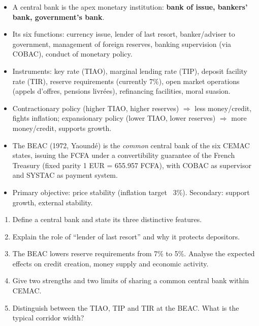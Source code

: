 \documentclass[11pt]{article}
\begin{document}
\begin{aretenir}
\begin{itemize}
\item A central bank is the apex monetary institution: \textbf{bank of issue, bankers' bank, government's bank}.
\item Its six functions: currency issue, lender of last resort, banker/adviser to government, management of foreign reserves, banking supervision (via COBAC), conduct of monetary policy.
\item Instruments: key rate (TIAO), marginal lending rate (TIP), deposit facility rate (TIR), reserve requirements (currently 7\%), open market operations (appels d'offres, pensions livrées), refinancing facilities, moral suasion.
\item Contractionary policy (higher TIAO, higher reserves) $\Rightarrow$ less money/credit, fights inflation; expansionary policy (lower TIAO, lower reserves) $\Rightarrow$ more money/credit, supports growth.
\item The BEAC (1972, Yaoundé) is the \emph{common} central bank of the six CEMAC states, issuing the FCFA under a convertibility guarantee of the French Treasury (fixed parity 1 EUR = 655.957 FCFA), with COBAC as supervisor and SYSTAC as payment system.
\item Primary objective: price stability (inflation target ~3\%). Secondary: support growth, external stability.
\end{itemize}
\end{aretenir}

\begin{exercice}
\begin{enumerate}
\item Define a central bank and state its three distinctive features.
\item Explain the role of ``lender of last resort'' and why it protects depositors.
\item The BEAC lowers reserve requirements from 7\% to 5\%. Analyse the expected effects on credit creation, money supply and economic activity.
\item Give two strengths and two limits of sharing a common central bank within CEMAC.
\item Distinguish between the TIAO, TIP and TIR at the BEAC. What is the typical corridor width?
\end{enumerate}
\end{exercice}
\end{document}
